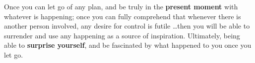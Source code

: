 Once you can let go of any plan, and be truly in the \textbf{present moment} with whatever is happening; once you can fully comprehend that whenever there is another person involved, any desire for control is futile \ldots then you will be able to surrender and use any happening as a source of inspiration.
Ultimately, being able to \textbf{surprise yourself}, and be fascinated by what happened to you once you let go.
